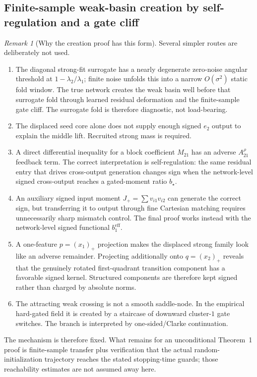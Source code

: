 \documentclass{article} %
\theoremstyle{plain}
\theoremstyle{definition}
\theoremstyle{remark}
\newtheorem{remark}[theorem]{Remark}
\begin{document}

\subsection{Finite-sample weak-basin creation by self-regulation and a gate cliff}
\label{subsec:gate-cliff-creation}

\begin{remark}[Why the creation proof has this form]
\label{rem:creation-provenance}
Several simpler routes are deliberately not used.
\begin{enumerate}[label=\textnormal{(\roman*)},leftmargin=2.4em]
\item
The diagonal strong-fit surrogate has a nearly degenerate zero-noise angular
threshold at $1-\lambda_2/\lambda_1$; finite noise unfolds this into a narrow
$O(\sigma^2)$ static fold window.  The true network creates the weak basin
well before that surrogate fold through learned residual deformation and the
finite-sample gate cliff.  The surrogate fold is therefore diagnostic, not
load-bearing.
\item
The displaced seed core alone does not supply enough signed $e_2$ output to
explain the middle lift.  Recruited strong mass is required.
\item
A direct differential inequality for a block coefficient $M_{21}$ has an
adverse $A_{21}^\rho$ feedback term.  The correct interpretation is
self-regulation: the same residual entry that drives cross-output generation
changes sign when the network-level signed cross-output reaches a gated-moment
ratio $b_\star$.
\item
An auxiliary signed input moment $J_+=\sum v_{i1}v_{i2}$ can generate the
correct sign, but transferring it to output through fine Cartesian matching
requires unnecessarily sharp mismatch control.  The final proof works
instead with the network-level signed functional $b_1^{\mathrm{eff}}$.
\item
A one-feature $p=(x_1)_+$ projection makes the displaced strong family look
like an adverse remainder.  Projecting additionally onto
$q=(x_2)_+$ reveals that the genuinely rotated first-quadrant transition
component has a favorable signed kernel.  Structured components are therefore
kept signed rather than charged by absolute norms.
\item
The attracting weak crossing is not a smooth saddle-node.  In the empirical
hard-gated field it is created by a staircase of downward cluster-$1$ gate
switches.  The branch is interpreted by one-sided/Clarke continuation.
\end{enumerate}
The mechanism is therefore fixed.  What remains for an unconditional
Theorem~1 proof is finite-sample transfer plus verification that the actual
random-initialization trajectory reaches the stated stopping-time guards;
those reachability estimates are not assumed away here.
\end{remark}
\end{document}
